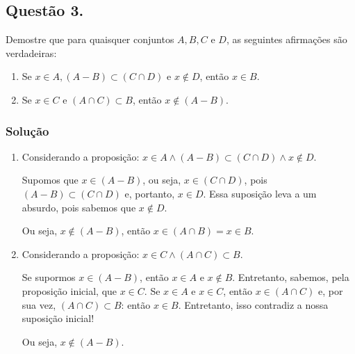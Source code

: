 \documentclass[12pt, letterpaper]{report}
\newcounter{ProblemNum}
\newcommand*{\anyproblem}[1]{\newpage\subsection*{#1}}
\newcommand*{\problem}[1]{\stepcounter{ProblemNum} %
   \anyproblem{Questão #1}}
\newcommand*{\soln}[1]{\subsubsection*{#1}}
\newcommand*{\solution}{\soln{Solução}}
\begin{document}
\problem{3.}
Demostre que para quaisquer conjuntos $A, B, C$ e $D$, as seguintes afirmações são
 verdadeiras:

  \begin{enumerate}[label=\arabic*.]
    \item Se $ x \in A, (A - B) \subset (C \cap D) $ e $ x \not \in D $, então $ x \in B $.
    \item Se $ x \in C $ e $ (A \cap C) \subset B $, então $ x \not \in (A - B) $.
  \end{enumerate}

\solution
  \begin{enumerate}[label=\arabic*.]
    \item Considerando a proposição: $x \in A \land (A - B) \subset (C \cap D) \land x \not \in D$. 

    Supomos que $x \in (A - B)$, ou seja, $x \in (C \cap D)$, pois $(A - B) \subset (C \cap D)$ e, portanto, $x \in D$. Essa suposição leva a um absurdo, pois sabemos que $x \not \in D$. 

    Ou seja, $x \not \in (A - B)$, então $x \in (A \cap B) = x \in B$.

    \item Considerando a proposição: $ x \in C \land (A \cap C) \subset B $.

    Se supormos $x \in (A - B)$, então $x \in A$ e $x \not \in B$. Entretanto, sabemos, pela proposição inicial, que $x \in C$. Se $x \in A$ e $x \in C$, então $x \in (A \cap C)$ e, por sua vez, $(A \cap C) \subset B$: então $x \in B$. Entretanto, isso contradiz a nossa suposição inicial!



    Ou seja, $x \not \in (A - B)$.
  \end{enumerate}
\end{document}
